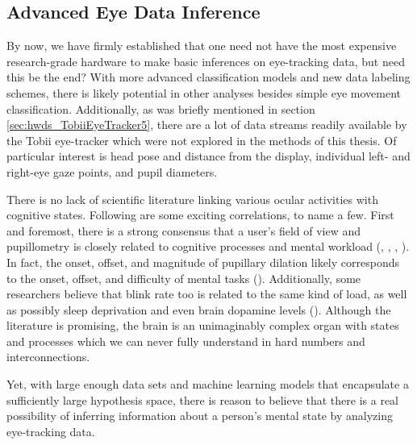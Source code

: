 \subsection{Advanced Eye Data Inference}

By now, we have firmly established that one need not have the most expensive research-grade hardware to make basic inferences on eye-tracking data, but need this be the end? With more advanced classification models and new data labeling schemes, there is likely potential in other analyses besides simple eye movement classification. Additionally, as was briefly mentioned in section \ref{sec:hwds_TobiiEyeTracker5}, there are a lot of data streams readily available by the Tobii eye-tracker which were not explored in the methods of this thesis. Of particular interest is head pose and distance from the display, individual left- and right-eye gaze points, and pupil diameters.

There is no lack of scientific literature linking various ocular activities with cognitive states. Following are some exciting correlations, to name a few. First and foremost, there is a strong consensus that a user's field of view and pupillometry is closely related to cognitive processes and mental workload (\cite{kahneman1966}, \cite{may1990}, \cite{chen2014}, \cite{seeber2013}). In fact, the onset, offset, and magnitude of pupillary dilation likely corresponds to the onset, offset, and difficulty of mental tasks (\cite{beatty1982}). Additionally, some researchers believe that blink rate too is related to the same kind of load, as well as possibly sleep deprivation and even brain dopamine levels (\cite{barbato1995}). Although the literature is promising, the brain is an unimaginably complex organ with states and processes which we can never fully understand in hard numbers and interconnections.

Yet, with large enough data sets and machine learning models that encapsulate a sufficiently large hypothesis space, there is reason to believe that there is a real possibility of inferring information about a person's mental state by analyzing eye-tracking data. 



